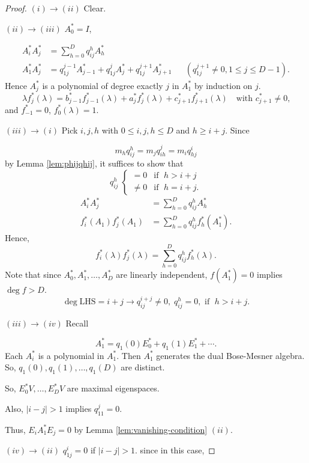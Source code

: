 \documentclass[
]{book}
\theoremstyle{definition}
\theoremstyle{definition}
\theoremstyle{definition}
\theoremstyle{definition}
\theoremstyle{remark}
\begin{document}
\begin{proof}
\leavevmode

\((i)\to (ii)\) Clear.

\((ii)\to(iii)\) \(A^*_0 = I\),

\begin{align}
A^*_iA^*_j & = \sum_{h=0}^D q^h_{ij} A^*_h\\
A^*_1A^*_j & = q^{j-1}_{1j}A^*_{j-1} + q^j_{1j}A^*_j + q^{j+1}_{1j}A^*_{j+1} && (q^{j+1}_{1j}\neq 0, 1\leq j\leq D-1).
\end{align}
Hence \(A^*_j\) is a polynomial of degree exactly \(j\) in \(A^*_1\) by induction on \(j\).
\[\lambda f^*_j(\lambda) = b^*_{j-1}f^*_{j-1}(\lambda) + a^*_jf^*_j(\lambda) + c^*_{j+1}f^*_{j+1}(\lambda) \quad \text{with $c^*_{j+1}\neq 0$,}\]
and \(f^*_{-1} = 0\), \(f^*_0(\lambda) = 1\).

\((iii)\to(i)\) Pick \(i, j, h\) with \(0\leq i,j,h\leq D\) and \(h\geq i+j\). Since

\[m_hq^h_{ij} = m_jq^j_{ih} = m_iq^i_{hj}\]
by Lemma \ref{lem:phijqhij}, it suffices to show that
\[q^h_{ij} \; \begin{cases} = 0 & \text{if }\; h> i+j\\
\neq 0 & \text{if }\; h = i+j.
\end{cases}\]
\begin{align}
A^*_iA^*_j & = \sum_{h=0}^D q^h_{ij}A^*_h\\
f^*_i(A_1)f^*_j(A_1) & = \sum_{h=0}^D q^h_{ij}f^*_h(A_1^*).
\end{align}
Hence,
\[f^*_i(\lambda)f^*_j(\lambda) = \sum_{h=0}^Dq^h_{ij}f^*_h(\lambda).\]
Note that since \(A^*_0, A^*_1, \ldots, A^*_D\) are linearly independent, \(f(A^*_1) = 0\) implies \(\deg f > D\).
\[\deg \mathrm{LHS} = i+j \to q^{i+j}_{ij}\neq 0, \; q^h_{ij} = 0, \text{ if } \; h> i+j.\]

\((iii)\to (iv)\) Recall

\[A^*_1 = q_1(0)E^*_0 + q_1(1)E_1^* + \cdots .\]
Each \(A^*_i\) is a polynomial in \(A^*_1\). Then \(A^*_1\) generates the dual Bose-Mesner algebra. So,
\(q_1(0), q_1(1), \ldots, q_1(D)\) are distinct.

So, \(E^*_0V, \ldots, E^*_DV\) are maximal eigenspaces.

Also, \(|i-j|>1\) implies \(q^j_{11} = 0\).

Thus, \(E_iA^*_1E_j = 0\) by Lemma \ref{lem:vanishing-condition} \((ii)\).

\((iv)\to (ii)\) \(q^i_{1j} = 0\) if \(|i-j| > 1\). since in this case,


\end{proof}
\end{document}
